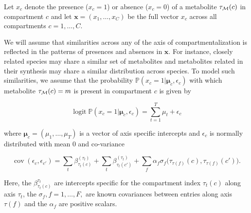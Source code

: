 \documentclass[a4paper,10pt]{article}
\DeclareMathOperator{\logit}{logit}
\DeclareMathOperator{\cov}{cov}
\def\P{\mathbb{P}}
\def\M{\boldsymbol{M}}
\def\x{\boldsymbol{x}}
\def\M{{\cal M}}
\def\bmu{\boldsymbol{\mu}}
\begin{document}
Let $x_{c}$ denote the presence ($x_c=1$) or absence ($x_c=0$) of a metabolite $\tau_\M(c)$ in compartment $c$ and let $\x=(x_1, \ldots, x_C)$ be the full vector $x_c$ across all compartments $c=1, \ldots, C$.

We will assume that similarities across any of the axis of compartmentalization is reflected in the patterns of presences and absences in $\x$. For instance, closely related species may share a similar set of metabolites and  metabolites related in their synthesis may share a similar distribution across species. To model such similarities, we assume that the probability $\P(x_c=1|\bmu_c, \epsilon_c)$ with which metabolite $\tau_\M(c)=m$ is present in compartment $c$ is given by

\begin{equation}
	\logit \P(x_c=1|\bmu_c, \epsilon_c) = \sum_{t=1}^{T} \mu_t + \epsilon_{c}
\end{equation}

where $\bmu_c=(\mu_1, \ldots, \mu_T)$ is a vector of axis specific intercepts and $\epsilon_{c}$ is normally distributed with mean 0 and co-variance

\begin{equation}
	\cov(\epsilon_c, \epsilon_{c'}) = \sum_t \beta^{(\tau_t)}_{\tau_t(c)} + \sum_t \beta^{(\tau_t)}_{\tau_t(c')} + \sum_f \alpha_f \sigma_f\Big(\tau_{\tau(f)}(c), \tau_{\tau(f)}(c')\Big).
\end{equation}


Here, the $\beta^{\tau_t}_{\tau_t(c)}$ are intercepts specific for the compartment index $\tau_t(c)$ along axis $\tau_t$, the $\sigma_{f}, f=1, \ldots, F,$ are known covariances between entries along axis $\tau(f)$ and the $\alpha_f$ are positive scalars.



\end{document}
